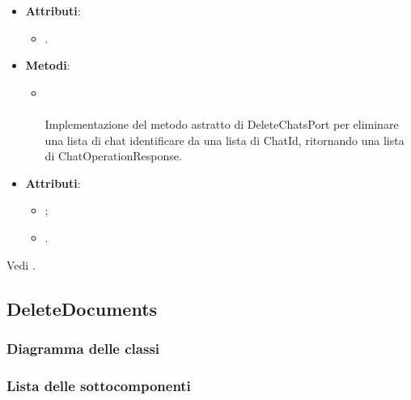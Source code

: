 \documentclass[10pt, a4paper]{article}
\begin{document}
    \label{DeleteChatsPostgresDettaglio}
    \begin{itemize}
        \item \textbf{Attributi}:
        \begin{itemize}
            \item {}.
        \end{itemize}
        \item \textbf{Metodi}:
        \begin{itemize}
            \item {}\\ \\
            Implementazione del metodo astratto di DeleteChatsPort per eliminare una lista di chat identificare da una lista di ChatId, ritornando una lista di ChatOperationResponse.
        \end{itemize}
    \end{itemize}
    
    \label{ChatOperationResponseDettaglio}
    \begin{itemize}
        \item \textbf{Attributi}:
        \begin{itemize}
            \item {};
            \item {}.
        \end{itemize}
    \end{itemize}
    
    Vedi .
    
\subsection{DeleteDocuments}
\subsubsection{Diagramma delle classi}
\subsubsection{Lista delle sottocomponenti}
\end{document}
